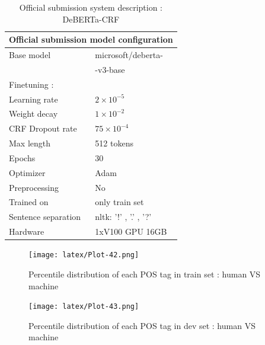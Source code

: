\documentclass[11pt]{article}
\begin{document}
\begin{table}[!ht]
\centering
\begin{tabular}{|l|l|}
\hline
\multicolumn{2}{|c|}{Official submission model configuration} \\
\hline
Base model & microsoft/deberta-\\
& -v3-base \\
\hline
\centering
Finetuning : & \\
\hspace{2ex}Learning rate & $2 \times 10^{-5}$ \\
\hspace{2ex}Weight decay & $1 \times 10^{-2}$ \\
\hspace{2ex}CRF Dropout rate & $75 \times 10^{-4}$ \\
\hspace{2ex}Max length & 512 tokens \\
\hspace{2ex}Epochs & 30 \\
\hspace{2ex}Optimizer & Adam \\
\hline
Preprocessing & No \\
\hline
Trained on & only train set \\
\hline
Sentence separation & nltk: '!' , '.' , '?' \\
\hline
Hardware & 1xV100 GPU 16GB \\
\hline
\end{tabular}
\caption{Official submission system description : DeBERTa-CRF}
\label{table:6}
\end{table}

\begin{figure}[ht]
\centering
\texttt{[image: latex/Plot-42.png]}
\caption{Percentile distribution of each POS tag in train set : human VS machine}
\label{figure:8}
\end{figure}
\begin{figure}[ht]
\centering
\texttt{[image: latex/Plot-43.png]}
\caption{Percentile distribution of each POS tag in dev set : human VS machine}
\label{figure:9}
\end{figure}
\end{document}
